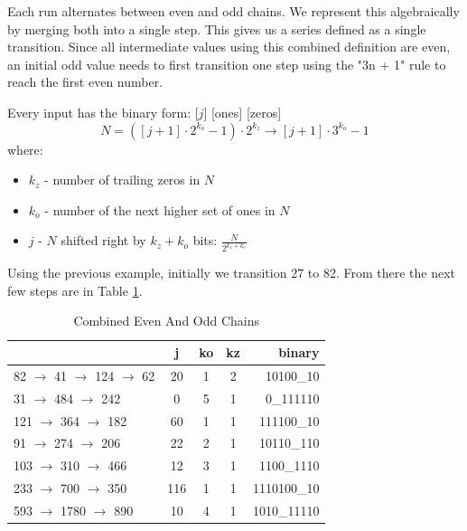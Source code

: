 \documentclass[preprint]{sigplanconf}
\begin{document}
Each run alternates between even and odd chains. We represent this algebraically by merging both into a single step. This gives us a series defined as a single transition. Since all intermediate values using this combined definition are even, an initial odd value needs to first transition one step using the "3n + 1" rule to reach the first even number.

Every input has the binary form: [$j$] [ones] [zeros]
\[
    N = ([j + 1] \cdot 2^{k_o} - 1) \cdot 2^{k_z} \rightarrow [j + 1] \cdot 3^{k_o} - 1
\]
where:
\begin{itemize}
    \item $k_z$ - number of trailing zeros in $N$
    \item $k_o$ - number of the next higher set of ones in $N$
    \item $j$ - $N$ shifted right by $k_z + k_o$ bits: $\frac{N}{2^{k_z + k_o}}$
\end{itemize}

Using the previous example, initially we transition 27 to 82. From there the next few steps are in Table \ref{table:combinedEvenAndOddChains}.

\begin{table} [ht]
    \begin{center}
        \begin{tabular}{|l|c|c|c|r|}
            \hline
                                                        & \textbf{j} & \textbf{ko} & \textbf{kz} & \textbf{binary} \\
            \hline
            \phantom{1}82 $\to$ 41  $\to$  124 $\to$ 62 & 20         & 1           & 2           & 10100\_10       \\
            \hline
            \phantom{1}31  $\to$  484 $\to$ 242         & 0          & 5           & 1           & 0\_111110       \\
            \hline
            121 $\to$  364 $\to$ 182                    & 60         & 1           & 1           & 111100\_10      \\
            \hline
            \phantom{1}91 $\to$  274 $\to$ 206          & 22         & 2           & 1           & 10110\_110      \\
            \hline
            103 $\to$  310 $\to$ 466                    & 12         & 3           & 1           & 1100\_1110      \\
            \hline
            233 $\to$  700 $\to$ 350                    & 116        & 1           & 1           & 1110100\_10     \\
            \hline
            593 $\to$ 1780 $\to$ 890                    & 10         & 4           & 1           & 1010\_11110     \\
            \hline
        \end{tabular}
        \caption{Combined Even And Odd Chains}
        \label{table:combinedEvenAndOddChains}
    \end{center}
\end{table}
\end{document}

